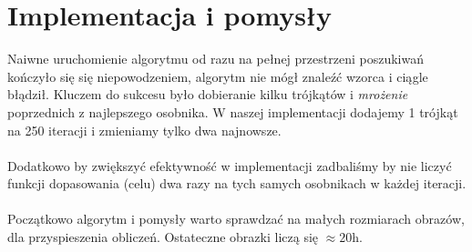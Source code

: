 \documentclass{article}
\begin{document}
\section{Implementacja i pomysły}
Naiwne uruchomienie algorytmu od razu na pełnej przestrzeni poszukiwań kończyło się się niepowodzeniem, algorytm nie mógł znaleźć wzorca i ciągle błądził. Kluczem do sukcesu było dobieranie kilku trójkątów i \textit{mrożenie} poprzednich z najlepszego osobnika. W naszej implementacji dodajemy 1 trójkąt na 250 iteracji i zmieniamy tylko dwa najnowsze.\\\\
Dodatkowo by zwiększyć efektywność w implementacji zadbaliśmy by nie liczyć funkcji dopasowania (celu) dwa razy na tych samych osobnikach w każdej iteracji.\\\\
Początkowo algorytm i pomysły warto sprawdzać na małych rozmiarach obrazów, dla przyspieszenia obliczeń. Ostateczne obrazki liczą się $\approx 20$h.
\end{document}
